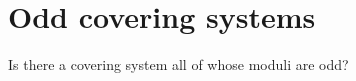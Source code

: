 \section{Odd covering systems}

\begin{problem}
Is there a covering system all of whose moduli are odd?
\end{problem}
